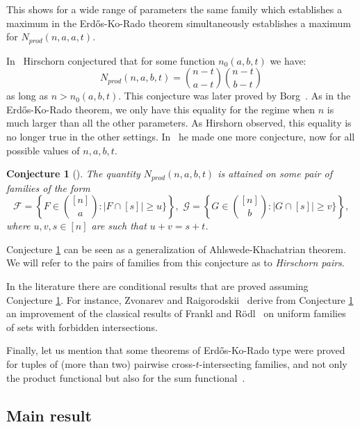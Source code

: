 \documentclass[12pt]{article}
\let\geq\geqslant
\let\ge\geq
\def\F{{\mathcal F}}
\def\G{{\mathcal G}}
\newtheorem{conj}[theorem]{Conjecture}
\begin{document}
This shows for a wide range of parameters the same family which establishes a maximum in the Erd\H{o}s-Ko-Rado theorem simultaneously establishes a maximum for  $N_{prod}(n,a, a, t)$.



In~\cite{hirschorn2008asymptotic} Hirschorn conjectured that for some function $n_0(a, b, t)$ we have:
\[
 N_{prod}(n,a,b,t) = \binom{n-t}{a-t}   \binom{n-t}{b-t}
\]
as long as $n>n_0(a,b,t)$. This conjecture was later proved by Borg~\cite{Borg2014TheMP}. As in the Erd\H{o}s-Ko-Rado theorem, we only have this equality for the regime when $n$ is much larger than all the other parameters. As Hirshorn observed, this equality is no longer true in the other settings. In~\cite{hirschorn2008asymptotic} he made one more conjecture, now for all possible values of $n, a, b, t$.


\begin{conj}[\cite{hirschorn2008asymptotic}]\label{Hirschorn} The quantity
  $N_{prod}(n,a, b, t)$ is attained on some pair of families of the form
$$\F = \left\{F \in\binom{[n]}{a} : |F\cap [s]| \ge u\}\right\}, \,\, \G = \left\{G \in\binom{[n]}{b} : |G\cap [s]| \ge v\}\right\},$$ 
where $u, v, s\in [n]$ are such that $u + v = s + t$.
\end{conj}
Conjecture \ref{Hirschorn} can be seen as a generalization of Ahlswede-Khachatrian theorem.
We will  refer to the pairs of families from this conjecture as to \emph{Hirschorn pairs}. 

In the literature there are conditional results that are proved assuming Conjecture \ref{Hirschorn}. For instance, Zvonarev and Raigorodskii~\cite[Theorem 3]{ZR15} derive from Conjecture \ref{Hirschorn} an improvement of the classical results of Frankl and R{\"o}dl~\cite{frankl1987forbidden} on uniform families of sets with forbidden intersections.

Finally, let us mention that some theorems of Erd\H{o}s-Ko-Rado type were proved for tuples of (more than two) pairwise cross-$t$-intersecting families, and not only the product functional but also for the sum functional~\cite{WANG2011455, BORG2014117}.



\subsection{Main result}
\end{document}
